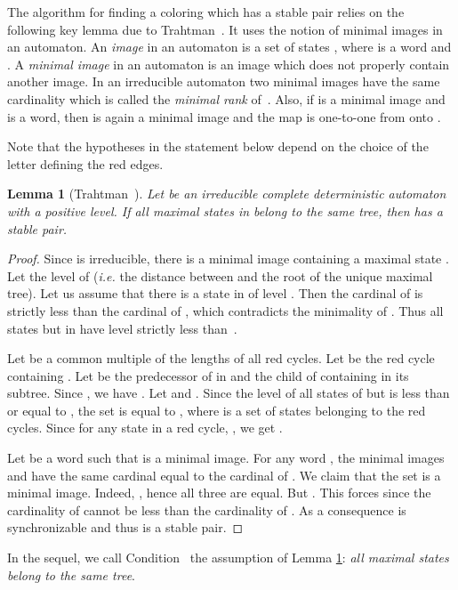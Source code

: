 \documentclass[11pt,a4paper]{article}
\newtheorem{lemma}[theorem]{Lemma}
\newcommand{\ie}{{\itshape i.e.}\xspace }
\begin{document}
The algorithm for finding a coloring which has a stable pair relies on
the following key lemma due to Trahtman~\cite{Trahtman09}. It uses the
notion of minimal images in an automaton.  An \emph{image} in an
automaton  is a set of states , where  is
a word and .  A \emph{minimal
  image} in an automaton is an image which does not properly contain
another image. In an irreducible automaton two minimal images have
the same cardinality which is called the \emph{minimal rank} of~.
Also, if  is a minimal image and  is a word, then  is
again a minimal image and the map  is
one-to-one from  onto .

Note that the hypotheses in the statement below depend on the choice
of the letter  defining the red edges.
\begin{lemma}[Trahtman~\cite{Trahtman09}] \label{lemma.sameTree} Let
   be an irreducible complete deterministic automaton with a
  positive level.  If all maximal states in  belong to the same
  tree, then  has a stable pair.
\end{lemma}

\begin{proof}
Since  is irreducible, there is a minimal image  containing a
  maximal state . Let  the level of  (\ie the distance
  between  and the root  of the unique maximal tree). Let us assume
  that there is a state  in  of level .  Then the
  cardinal of  is strictly less than the cardinal of
  , which contradicts the minimality of . Thus all states but
   in  have level strictly less than~.

  Let  be a common multiple of the lengths of all red cycles. Let
   be the red cycle containing . Let  be the predecessor
  of  in  and  the child of  containing  in its
  subtree. Since , we have .  Let  and .  Since the level of all states of
   but  is less than or equal to , the set  is equal
  to , where  is a set of states belonging to the
  red cycles.  Since for any state  in a red cycle, , we get .
 
  Let  be a word such that  is a minimal image. For any
  word , the minimal images  and  have the
  same cardinal equal to the cardinal of .  We claim that the set
   is a minimal image. Indeed, , hence all three
  are equal. But .  This forces  since
  the cardinality of  cannot be less than the cardinality
  of . As a consequence  is
  synchronizable and thus  is a stable pair.
\end{proof}

In the sequel, we call Condition~ the assumption of
Lemma \ref{lemma.sameTree}: \emph{all maximal states belong to the same
  tree}.  
\end{document}
